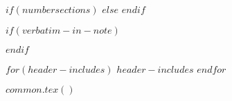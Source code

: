 $if(numbersections)$
$else$
\setcounter{secnumdepth}{0}
$endif$

$if(verbatim-in-note)$
\usepackage{fancyvrb}
\VerbatimFootnotes
$endif$

$for(header-includes)$
$header-includes$
$endfor$

$common.tex()$